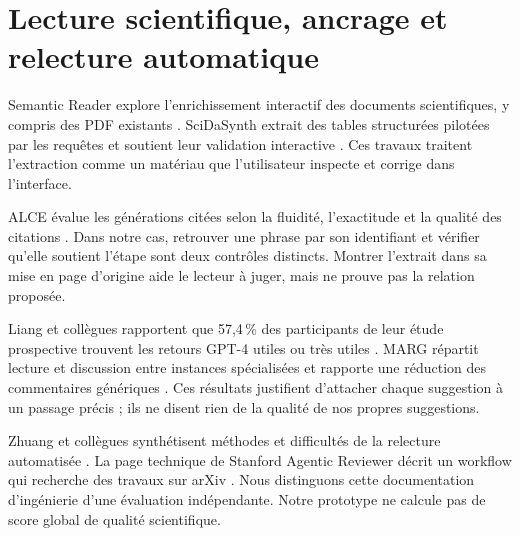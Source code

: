 \section{Lecture scientifique, ancrage et relecture automatique}
Semantic Reader explore l'enrichissement interactif des documents scientifiques, y compris des PDF existants \cite{ref15}. SciDaSynth extrait des tables structurées pilotées par les requêtes et soutient leur validation interactive \cite{ref16}. Ces travaux traitent l'extraction comme un matériau que l'utilisateur inspecte et corrige dans l'interface.

ALCE évalue les générations citées selon la fluidité, l'exactitude et la qualité des citations \cite{ref17}. Dans notre cas, retrouver une phrase par son identifiant et vérifier qu'elle soutient l'étape sont deux contrôles distincts. Montrer l'extrait dans sa mise en page d'origine aide le lecteur à juger, mais ne prouve pas la relation proposée.

Liang et collègues rapportent que 57,4\,\% des participants de leur étude prospective trouvent les retours GPT-4 utiles ou très utiles \cite{ref18}. MARG répartit lecture et discussion entre instances spécialisées et rapporte une réduction des commentaires génériques \cite{ref19}. Ces résultats justifient d'attacher chaque suggestion à un passage précis ; ils ne disent rien de la qualité de nos propres suggestions.

Zhuang et collègues synthétisent méthodes et difficultés de la relecture automatisée \cite{ref20}. La page technique de Stanford Agentic Reviewer décrit un workflow qui recherche des travaux sur arXiv \cite{ref21}. Nous distinguons cette documentation d'ingénierie d'une évaluation indépendante. Notre prototype ne calcule pas de score global de qualité scientifique.
